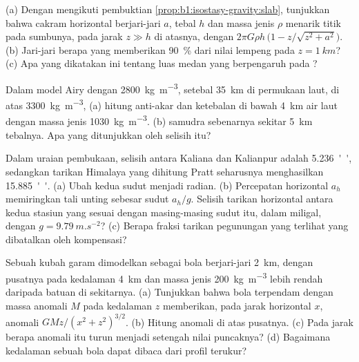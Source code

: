 \begin{exercise}[$\star\star$]\label{exo:b1:isostasy-gravity:7}
(a) Dengan mengikuti pembuktian \cref{prop:b1:isostasy-gravity:slab}, tunjukkan bahwa cakram horizontal berjari-jari $a$, tebal $h$ dan massa jenis $\rho$ menarik titik pada sumbunya,
pada jarak $z \gg h$ di atasnya, dengan $2\pi G\rho h\,\bigl(1 -
z/\sqrt{z^2 + a^2}\bigr)$. (b) Jari-jari berapa yang memberikan \qty{90}{\percent} dari nilai lempeng pada $z = \qty{1}{km}$? (c) Apa yang dikatakan ini tentang luas medan yang berpengaruh pada ?
\end{exercise}

\begin{exercise}[$\star\star$]\label{exo:b1:isostasy-gravity:8}
Dalam model Airy dengan  \qty{2800}{kg.m^{-3}}, setebal \qty{35}{km} di permukaan laut, di atas  \qty{3300}{kg.m^{-3}}, (a) hitung anti-akar dan ketebalan  di bawah \qty{4}{km} air laut dengan massa jenis \qty{1030}{kg.m^{-3}}.
(b)  samudra sebenarnya sekitar \qty{5}{km} tebalnya. Apa yang ditunjukkan oleh selisih itu? %
\end{exercise}

\begin{exercise}[$\star\star$]\label{exo:b1:isostasy-gravity:9}
Dalam uraian pembukaan, selisih  antara Kaliana dan Kalianpur adalah \qty{5.236}{''}, sedangkan tarikan Himalaya yang dihitung Pratt seharusnya menghasilkan \qty{15.885}{''}. (a) Ubah kedua sudut menjadi radian.
(b) Percepatan horizontal $a_h$ memiringkan tali unting sebesar sudut $a_h/g$. Selisih tarikan horizontal antara kedua
stasiun yang sesuai dengan masing-masing sudut itu, dalam miligal, dengan
$g = \qty{9.79}{m.s^{-2}}$? (c) Berapa fraksi tarikan pegunungan yang terlihat yang dibatalkan oleh kompensasi?
\end{exercise}

\begin{exercise}[$\star\star\star$]\label{exo:b1:isostasy-gravity:10}
Sebuah kubah garam dimodelkan sebagai bola berjari-jari \qty{2}{km}, dengan pusatnya pada kedalaman \qty{4}{km} dan massa jenis \qty{200}{kg.m^{-3}} lebih rendah daripada batuan di sekitarnya. (a) Tunjukkan bahwa bola terpendam dengan massa anomali $M$ pada kedalaman $z$
memberikan, pada jarak horizontal $x$, anomali $GMz/(x^2 + z^2)^{3/2}$. (b) Hitung anomali di atas pusatnya. (c) Pada jarak berapa anomali itu turun menjadi setengah nilai puncaknya? (d) Bagaimana kedalaman sebuah bola dapat dibaca dari profil terukur?
\end{exercise}

